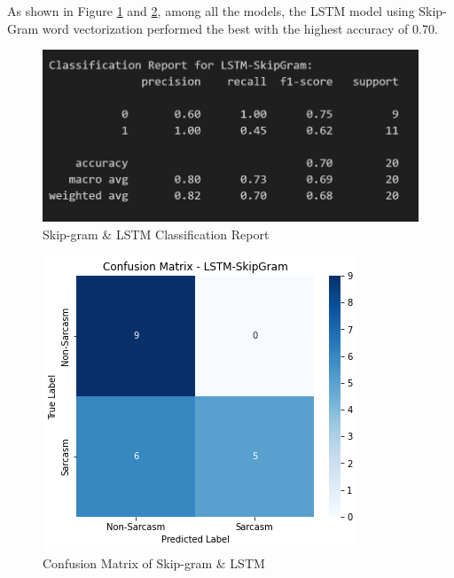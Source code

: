\documentclass[11pt]{article}
\begin{document}
As shown in Figure \ref{fig:sglstmcr} and \ref{fig:sglstmcm}, among all the models, the LSTM model using Skip-Gram word vectorization performed the best with the highest accuracy of 0.70.
\begin{figure}[htbp]
    \centering
    \includegraphics[width=.8\linewidth]{pic/LSTM-Skipgram-Report.png}
    \caption{Skip-gram \& LSTM Classification Report}
    \label{fig:sglstmcr}
\end{figure}
\begin{figure}[htbp]
    \centering
    \includegraphics[width=.8\linewidth]{pic/LSTM-skipgram-Matrix.png}
    \caption{Confusion Matrix of Skip-gram \& LSTM}
    \label{fig:sglstmcm}
\end{figure}
\end{document}
